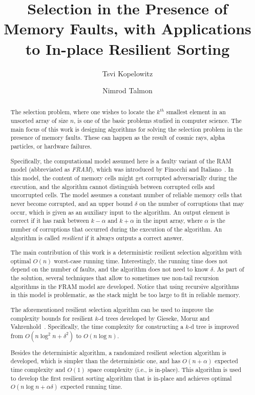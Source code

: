 \documentclass{llncs}
\begin{document}
\title{Selection in the Presence of Memory Faults, with Applications to In-place Resilient Sorting}
\author{
    Tsvi Kopelowitz
    \and
    Nimrod Talmon}
\maketitle


\begin{abstract}

The selection problem, where one wishes to locate the $k^{th}$ smallest element in an unsorted array of size $n$, is one of the basic problems studied in computer science. The main focus of this work is designing algorithms for solving the selection problem in the presence of memory faults. These can happen as the result of cosmic rays, alpha particles, or hardware failures.

Specifically, the computational model assumed here is a faulty variant of the RAM model (abbreviated as \emph{FRAM}), which was introduced by Finocchi and Italiano~\cite{resilient_data_structures}. In this model, the content of memory cells might get corrupted adversarially during the execution, and the algorithm cannot distinguish between corrupted cells and uncorrupted cells. The model assumes a constant number of reliable memory cells that never become corrupted, and an upper bound $\delta$ on the number of corruptions that may occur, which is given as an auxiliary input to the algorithm. An output element is correct if it has rank between $k-\alpha$ and $k+\alpha$ in the input array, where $\alpha$ is the number of corruptions that occurred during the execution of the algorithm. An algorithm is called \emph{resilient} if it always outputs a correct answer.

The main contribution of this work is a deterministic resilient selection algorithm with optimal $O(n)$ worst-case running time. Interestingly, the running time does not depend on the number of faults, and the algorithm does not need to know $\delta$. As part of the solution, several techniques that allow to sometimes use non-tail recursion algorithms in the FRAM model are developed. Notice that using recursive algorithms in this model is problematic, as the stack might be too large to fit in reliable memory.

The aforementioned resilient selection algorithm can be used to improve the complexity bounds for resilient $k$-d trees developed by Gieseke, Moruz and Vahrenhold~\cite{kd_trees}. Specifically, the time complexity for constructing a $k$-d tree is improved from $O(n\log^2 n + \delta^2)$ to $O(n \log n)$.

Besides the deterministic algorithm, a randomized resilient selection algorithm is developed, which is simpler than the deterministic one, and has $O(n + \alpha)$ expected time complexity and $O(1)$ space complexity (i.e., is in-place). This algorithm is used to develop the first resilient sorting algorithm that is in-place and achieves optimal $O(n\log n + \alpha\delta)$ expected running time.
\end{abstract}
\end{document}
